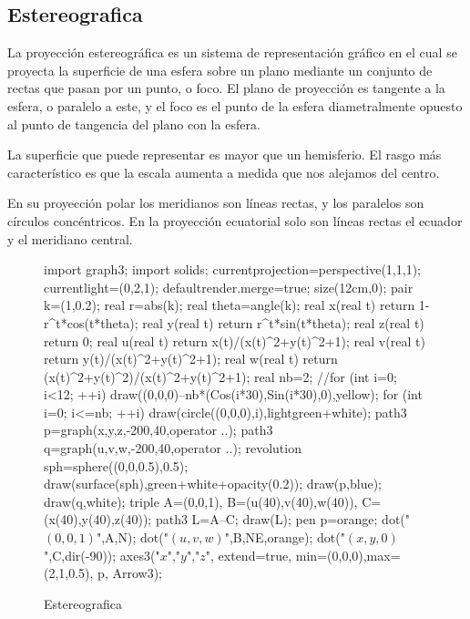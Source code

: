 \subsection{Estereografica}
La proyección estereográfica es un sistema de representación gráfico en el cual se proyecta la superficie de una esfera sobre un plano mediante un conjunto de rectas que pasan por un punto, o foco. El plano de proyección es tangente a la esfera, o paralelo a este, y el foco es el punto de la esfera diametralmente opuesto al punto de tangencia del plano con la esfera.

La superficie que puede representar es mayor que un hemisferio. El rasgo más característico es que la escala aumenta a medida que nos alejamos del centro.

En su proyección polar los meridianos son líneas rectas, y los paralelos son círculos concéntricos. En la proyección ecuatorial solo son líneas rectas el ecuador y el meridiano central.
\begin{figure}[!ht]
	\centering
	\begin{asy}
import graph3;
import solids;
currentprojection=perspective(1,1,1);
currentlight=(0,2,1);
defaultrender.merge=true;
size(12cm,0);
pair k=(1,0.2);
real r=abs(k);
real theta=angle(k);
real x(real t) { return 1-r^t*cos(t*theta); }
real y(real t) { return r^t*sin(t*theta); }
real z(real t) { return 0; }
real u(real t) { return x(t)/(x(t)^2+y(t)^2+1); }
real v(real t) { return y(t)/(x(t)^2+y(t)^2+1); }
real w(real t) { return (x(t)^2+y(t)^2)/(x(t)^2+y(t)^2+1); }
real nb=2;
//for (int i=0; i<12; ++i) draw((0,0,0)--nb*(Cos(i*30),Sin(i*30),0),yellow);
for (int i=0; i<=nb; ++i) draw(circle((0,0,0),i),lightgreen+white);
path3 p=graph(x,y,z,-200,40,operator ..);
path3 q=graph(u,v,w,-200,40,operator ..);
revolution sph=sphere((0,0,0.5),0.5);
draw(surface(sph),green+white+opacity(0.2));
draw(p,blue);
draw(q,white);
triple
A=(0,0,1),
B=(u(40),v(40),w(40)),
C=(x(40),y(40),z(40));
path3 L=A--C;
draw(L);
pen p=orange;
dot("$(0,0,1)$",A,N);
dot("$(u,v,w)$",B,NE,orange);
dot("$(x,y,0)$",C,dir(-90));
axes3("$x$","$y$","$z$", extend=true, min=(0,0,0),max=(2,1,0.5), p, Arrow3);
	\end{asy}
	\caption{Estereografica}
\end{figure}
